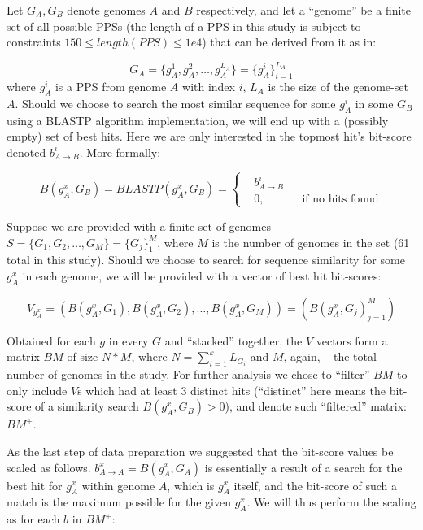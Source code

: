 \documentclass{article}
\begin{document}
Let $G_A, G_B$ denote genomes $A$ and $B$ respectively,
and let a ``genome'' be a finite set of all possible PPSs
(the length of a PPS in this study is subject to constraints
$150 \leq length(PPS) \leq 1e4$) that can be derived from it as in:

\begin{equation}
G_A = \{g_A^1, g_A^2, \ldots, g_A^{L_A}\} = \{g_A^i\}_{i=1}^{L_A}
\end{equation}
where $g_A^i$ is a PPS from genome $A$ with index $i$, $L_A$ is the size of
the genome-set $A$.
Should we choose to search the most similar sequence for some $g_A^i$ in some
$G_B$ using a BLASTP algorithm implementation, we will end up with a (possibly
empty) set of best hits. Here we are only interested in the topmost hit's
bit-score denoted $b_{A \rightarrow B}^i$. More formally:

\begin{equation}
B(g_A^x, G_B) = BLASTP(g_A^x, G_B)=\left \{
\begin{aligned}
&b_{A \rightarrow B}^i\\
&0, && \text{if no hits found}
\end{aligned} \right.
\end{equation} 

Suppose we are provided with a finite set of genomes \\
$S = \{G_1, G_2, \ldots, G_M\} = \{G_j\}_1^M$, where $M$ is the number of
genomes in the set (61 total in this study). Should we choose to search for
sequence similarity for some $g_A^x$ in each genome, we will be provided with a
vector of best hit bit-scores:

\begin{equation}
V_{g_A^x} = (B(g_A^x, G_1), B(g_A^x, G_2), \ldots, B(g_A^x, G_M)) = (B(g_A^x,
G_j)_{j=1}^M)
\end{equation}

Obtained for each $g$ in every $G$ and ``stacked'' together, the $V$ vectors
form a matrix $BM$ of size $N*M$, where $N=\sum_{i=1}^k L_{G_i}$ and $M$,
again, -- the total number of genomes in the study. For further analysis we chose
to ``filter'' $BM$ to only include $V$s which had at least 3 distinct hits
(``distinct'' here means the bit-score of a similarity search $B(g_A^x,
G_B)>0$), and denote such ``filtered'' matrix: $BM^+$.

As the last step of data preparation we suggested that the bit-score values be
scaled as follows. $b_{A \rightarrow A}^x = B(g_A^x, G_A)$ is essentially a
result of a search for the best hit for $g_A^x$ within genome $A$, which is
$g_A^x$ itself, and the bit-score of such a match is the maximum possible for
the given $g_A^x$. We will thus perform the scaling as for each $b$ in $BM^+$:
\end{document}
